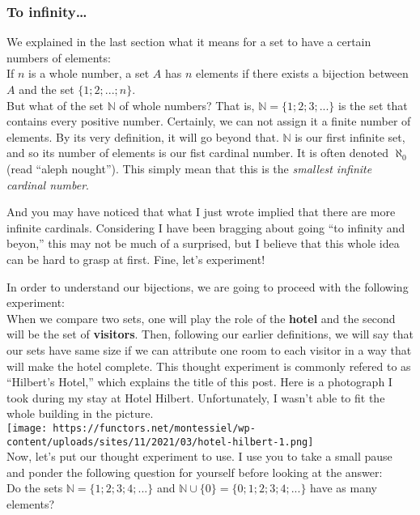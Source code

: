 \documentclass[
]{article}
\begin{document}
\hypertarget{to-infinity}{%
\subsubsection{To infinity\ldots{}}\label{to-infinity}}

We explained in the last section what it means for a set to have a
certain numbers of elements:\\
If \(n\) is a whole number, a set \(A\) has \(n\) elements if there
exists a bijection between \(A\) and the set \(\{1;2;...;n\}\).\\
But what of the set \(\mathbb{N}\) of whole numbers? That is,
\(\mathbb{N} = \{1;2;3;...\}\) is the set that contains every positive
number. Certainly, we can not assign it a finite number of elements. By
its very definition, it will go beyond that. \(\mathbb{N}\) is our first
infinite set, and so its number of elements is our fist cardinal number.
It is often denoted \(\aleph_0\) (read ``aleph nought''). This simply
mean that this is the \emph{smallest infinite cardinal number}.

And you may have noticed that what I just wrote implied that there are
more infinite cardinals. Considering I have been bragging about going
``to infinity and beyon,'' this may not be much of a surprised, but I
believe that this whole idea can be hard to grasp at first. Fine, let's
experiment!

In order to understand our bijections, we are going to proceed with the
following experiment:\\
When we compare two sets, one will play the role of the \textbf{hotel}
and the second will be the set of \textbf{visitors}. Then, following our
earlier definitions, we will say that our sets have same size if we can
attribute one room to each visitor in a way that will make the hotel
complete. This thought experiment is commonly refered to as ``Hilbert's
Hotel,'' which explains the title of this post. Here is a photograph I
took during my stay at Hotel Hilbert. Unfortunately, I wasn't able to
fit the whole building in the picture.\\
\texttt{[image: https://functors.net/montessiel/wp-content/uploads/sites/11/2021/03/hotel-hilbert-1.png]}\\
Now, let's put our thought experiment to use. I use you to take a small
pause and ponder the following question for yourself before looking at
the answer:\\
Do the sets \(\mathbb{N} = \{1;2;3;4;...\}\) and
\(\mathbb{N} \cup \{0\} = \{0;1;2;3;4;...\}\) have as many elements?
\end{document}
